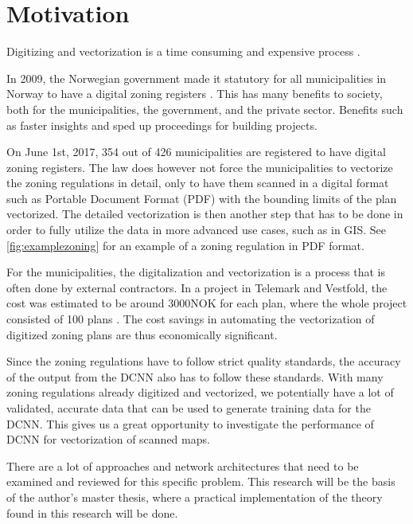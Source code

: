 \chapter{Motivation}\label{chp:motivation}
Digitizing and vectorization is a time consuming and expensive process \cite{Worboys2003}.

In 2009, the Norwegian government made it statutory for all municipalities in Norway to have a digital zoning registers \cite{Kommunaltplanregister2009}. This has many benefits to society, both for the municipalities, the government, and the private sector. Benefits such as faster insights and sped up proceedings for building projects. 

On June 1st, 2017, 354 out of 426 municipalities are registered to have digital zoning registers. The law does however not force the municipalities to vectorize the zoning regulations in detail, only to have them scanned in a digital format such as Portable Document Format (PDF) with the bounding limits of the plan vectorized. The detailed vectorization is then another step that has to be done in order to fully utilize the data in more advanced use cases, such as in GIS. See \autoref{fig:examplezoning} for an example of a zoning regulation in PDF format.

For the municipalities, the digitalization and vectorization is a process that is often done by external contractors. In a project in Telemark and Vestfold, the cost was estimated to be around 3000NOK for each plan, where the whole project consisted of 100 plans \cite{Bo2009}. The cost savings in automating the vectorization of digitized zoning plans are thus economically significant. 

Since the zoning regulations have to follow strict quality standards, the accuracy of the output from the DCNN also has to follow these standards. With many zoning regulations already digitized and vectorized, we potentially have a lot of validated, accurate data that can be used to generate training data for the DCNN. This gives us a great opportunity to investigate the performance of DCNN for vectorization of scanned maps. 

There are a lot of approaches and network architectures that need to be examined and reviewed for this specific problem. This research will be the basis of the author's master thesis, where a practical implementation of the theory found in this research will be done. 

